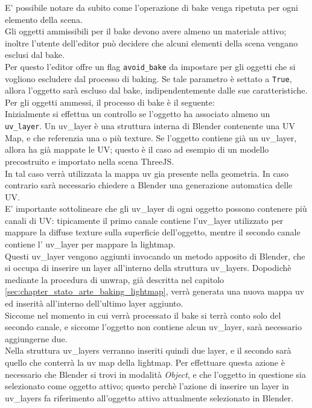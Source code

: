 E’ possibile notare da subito come l’operazione di bake venga ripetuta per ogni elemento della scena.
\\
Gli oggetti ammissibili per il bake devono avere almeno un materiale attivo; inoltre l’utente dell’editor può decidere che alcuni elementi della scena vengano esclusi dal bake. 
\\
Per questo l’editor offre un flag \texttt{avoid\_bake} da impostare per gli oggetti che si vogliono escludere dal processo di baking. Se tale parametro è settato a \texttt{True}, allora l’oggetto sarà escluso dal bake, indipendentemente dalle sue caratteristiche. 
Per gli oggetti ammessi, il processo di bake è il seguente:
\\
Inizialmente si effettua un controllo se l’oggetto ha associato almeno un \texttt{uv\_layer}. Un uv\_layer è una struttura interna di Blender contenente una UV Map, e che referenzia una o più texture. Se l’oggetto contiene già un uv\_layer, allora ha già mappate le UV; questo è il caso ad esempio di un modello precostruito e importato nella scena ThreeJS. 
\\
In tal caso verrà utilizzata la mappa uv gia presente nella geometria. In caso contrario sarà necessario chiedere a Blender una generazione automatica delle UV. 
\\
E’ importante sottolineare che gli uv\_layer di ogni oggetto possono contenere più canali di UV: tipicamente il primo canale contiene l’uv\_layer utilizzato per mappare la diffuse texture sulla superficie dell’oggetto, mentre il secondo canale contiene l’ uv\_layer per mappare la lightmap.
\\
Questi uv\_layer vengono aggiunti invocando un metodo apposito di Blender, che si occupa di inserire un layer all’interno della struttura uv\_layers. Dopodichè mediante la procedura di unwrap, già descritta nel capitolo \ref{sec:chapter_stato_arte_baking_lightmap}, verrà generata una nuova mappa uv ed inserità all’interno dell’ultimo layer aggiunto. 
\\
Siccome nel momento in cui verrà processato il bake si terrà conto solo del secondo canale, e siccome l’oggetto non contiene alcun uv\_layer, sarà necessario aggiungerne due.
\\
Nella struttura uv\_layers verranno inseriti quindi due layer, e il secondo sarà quello che conterrà la uv map della lightmap. Per effettuare questa azione è necessario che Blender si trovi in modalità \emph{Object}, e che l’oggetto in questione sia selezionato come oggetto attivo; questo perchè l’azione di inserire un layer in uv\_layers fa riferimento all’oggetto attivo attualmente selezionato in Blender. 

